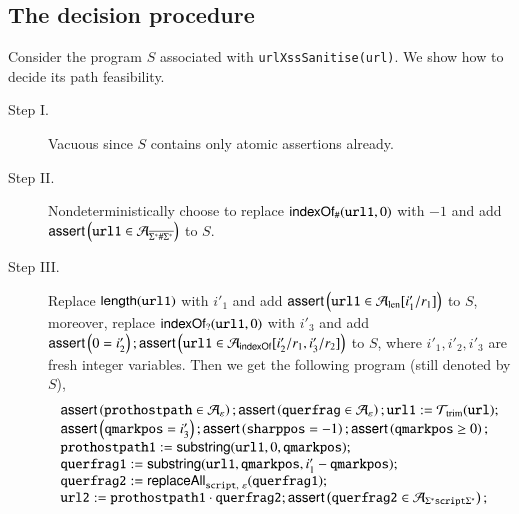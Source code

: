 \subsection{The decision procedure}
	Consider the program $S$ associated with {\tt urlXssSanitise(url)}. %
	We show how to decide its path feasibility. %
	\begin{description}
		\item[Step I.]   Vacuous since $S$ contains only atomic assertions already. %
		\item[Step II.] Nondeterministically choose to replace $\mathsf{indexOf}_\#(\mathtt{url1}, 0)$ with $-1$ and add $\textsf{assert}\left(\mathtt{url1} \in \mathcal{A}_{\overline{\Sigma^*\#\Sigma^*}}\right)$ to $S$.  
		\item[Step III.] Replace $\mathsf{length}(\mathtt{url1})$ with $i'_1$ and add $\textsf{assert}\left(\mathtt{url1} \in \mathcal{A}_{\rm len}[i'_1/r_1]\right)$ to $S$, moreover, replace $\mathsf{indexOf}_?(\mathtt{url1}, 0)$ with $i'_3$ and add $\textsf{assert}\left(0= i'_2\right); \textsf{assert}\left(\mathtt{url1} \in \mathcal{A}_{\mathsf{indexOf}}[i'_2/r_1, i'_3/r_2]\right)$ to $S$, where $i'_1, i'_2, i'_3$ are fresh integer variables. Then we get the following program (still denoted by $S$), 
		\[ 
		\begin{array}{l}
		\ASSERT{\mathtt{prothostpath} \in \NFA_\varepsilon}; \ASSERT{\mathtt{querfrag} \in \NFA_\varepsilon}; \mathtt{url1} := \NFT_{\rm trim}(\mathtt{url}); \\
		\ASSERT{\mathtt{qmarkpos} = i'_3}; \ASSERT{\mathtt{sharppos} =-1 }; \ASSERT{\mathtt{qmarkpos} \ge 0}; \\ 
		\mathtt{prothostpath1} := \substring(\mathtt{url1}, 0, \mathtt{qmarkpos});\\
		\mathtt{querfrag1} := \substring(\mathtt{url1, qmarkpos}, i'_1 - \mathtt{qmarkpos});\\
		\mathtt{querfrag2} := \replaceall_{\mathtt{script},\ \varepsilon}(\mathtt{querfrag1});\\
		\mathtt{url2} := \mathtt{prothostpath1} \concat \mathtt{querfrag2}; \ASSERT{\mathtt{querfrag2} \in  \NFA_{\Sigma^*\mathtt{script}\Sigma^*}};  \\

\end{array}\]
\end{description}
